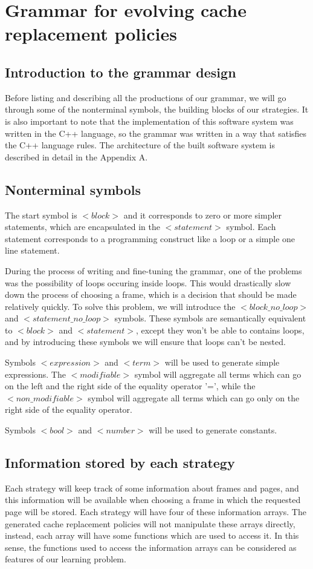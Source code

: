 \section{Grammar for evolving cache replacement policies}
\subsection{Introduction to the grammar design}
Before listing and describing all the productions of our grammar, we will go through some of the nonterminal symbols, the building blocks of our strategies. It is also important to note that the implementation of this software system was written in the C++ language, so the grammar was written in a way that satisfies the C++ language rules. The architecture of the built software system is described in detail in the Appendix A.

\subsection{Nonterminal symbols}
The start symbol is ${<}block{>}$ and it corresponds to zero or more simpler statements, which are encapsulated in the ${<}statement{>}$ symbol. Each statement corresponds to a programming construct like a loop or a simple one line statement.

During the process of writing and fine-tuning the grammar, one of the problems was the possibility of loops occuring inside loops. This would drastically slow down the process of choosing a frame, which is a decision that should be made relatively quickly. To solve this problem, we will introduce the ${<}block\_no\_loop{>}$ and ${<}statement\_no\_loop{>}$ symbols. These symbols are semantically equivalent to ${<}block{>}$ and ${<}statement{>}$, except they won't be able to contains loops, and by introducing these symbols we will ensure that loops can't be nested.

Symbols ${<}expression{>}$ and ${<}term{>}$ will be used to generate simple expressions. The ${<}modifiable{>}$ symbol	 will aggregate all terms which can go on the left and the right side of the equality operator '=', while the ${<}non\_modifiable{>}$ symbol will aggregate all terms which can go only on the right side of the equality operator.

Symbols ${<}bool{>}$ and ${<}number{>}$ will be used to generate constants.

\subsection{Information stored by each strategy}
Each strategy will keep track of some information about frames and pages, and this information will be available when choosing a frame in which the requested page will be stored. Each strategy will have four of these information arrays. The generated cache replacement policies will not manipulate these arrays directly, instead, each array will have some functions which are used to access it. In this sense, the functions used to access the information arrays can be considered as features of our learning problem.

